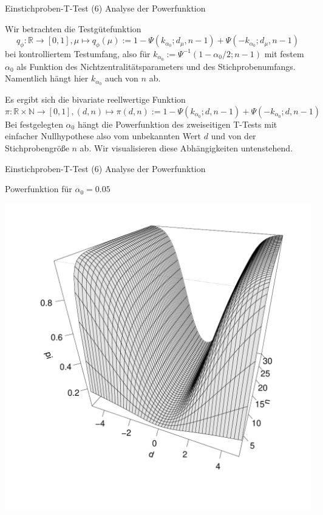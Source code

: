 \documentclass[
  8pt,
  ignorenonframetext,
]{beamer}
\begin{document}
\begin{frame}{Einstichproben-T-Test \textbar{} (6) Analyse der
Powerfunktion}
\protect\hypertarget{einstichproben-t-test-6-analyse-der-powerfunktion}{}
\vfill
\justifying

\small

Wir betrachten die Testgütefunktion \begin{equation}
q_\phi : \mathbb{R} \to [0,1],
\mu \mapsto q_\phi(\mu)
:= 1 - \Psi(k_{\alpha_0}; d_\mu, n-1) + \Psi(-k_{\alpha_0}; d_\mu, n-1)
\end{equation} bei kontrolliertem Testumfang, also für
\(k_{\alpha_0} := \Psi^{-1}(1-\alpha_0/2;n-1)\) mit festem \(\alpha_0\)
als Funktion des Nichtzentralitätsparameters und des Stichprobenumfangs.
Namentlich hängt hier \(k_{\alpha_0}\) auch von \(n\) ab.

Es ergibt sich die bivariate reellwertige Funktion \begin{equation}
\pi : \mathbb{R} \times \mathbb{N} \to [0,1],
(d,n) \mapsto
\pi(d,n) := 1 - \Psi(k_{\alpha_0}; d, n-1) + \Psi(-k_{\alpha_0}; d, n-1)
\end{equation} Bei festgelegten \(\alpha_0\) hängt die Powerfunktion des
zweiseitigen T-Tests mit einfacher Nullhypothese also vom unbekannten
Wert \(d\) und von der Stichprobengröße \(n\) ab. Wir visualisieren
diese Abhängigkeiten untenstehend. \vfill
\end{frame}

\begin{frame}{Einstichproben-T-Test \textbar{} (6) Analyse der
Powerfunktion}
\protect\hypertarget{einstichproben-t-test-6-analyse-der-powerfunktion-1}{}
\small

Powerfunktion für \(\alpha_0 = 0.05\)

\begin{center}\includegraphics[width=0.6\linewidth]{12_Abbildungen/wtfi_12_t_test_ungerichtet_power_005} \end{center}
\end{frame}
\end{document}
